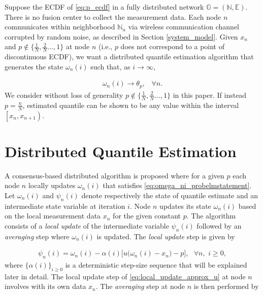 \documentclass[journal]{IEEEtran}
\begin{document}
Suppose the ECDF of \eqref{eq:p_ecdf} in a fully distributed network $\mathbb{G} = \left(\mathbb{N},\mathbb{E}\right)$. There is no fusion center to collect the measurement data. Each node $n$ communicates within neighborhood $\mathbb{N}_n$ via wireless communication channel corrupted by random noise, as described in Section \ref{system_model}. Given $x_n$ and $p \notin \{\frac{1}{N}, \frac{2}{N} \ldots, 1\}$ at node $n$ (i.e., $p$ does not correspond to a point of discontinuous ECDF), we want a distributed quantile estimation algorithm that generates the state $\omega_n(i)$ such that, as $i\to \infty$,

\vspace{-4mm}
\small 
\begin{align} 
\omega_n(i) \to \theta_p,\,\,\,\,\,\forall n. \label{eq:omega_ni_probelmstatement}
\end{align}
\normalsize 
We consider without loss of generality $p \notin \{\frac{1}{N}, \frac{2}{N} \ldots, 1\}$ in this paper. If instead $p=\frac{n}{N}$, estimated quantile can be shown to be any value within the interval $\left[x_n,x_{n+1}\right)$.




\vspace{-2mm}
\section{Distributed Quantile Estimation} \label{distributed_quantile_estimation}
A consensus-based distributed algorithm is proposed where for a given $p$ each node $n$ locally updates $\omega_n(i)$ that satisfies \eqref{eq:omega_ni_probelmstatement}{}{.} Let $\omega_n(i)$ and $\psi_n(i)$ denote respectively the state of quantile estimate and an intermediate state variable at iteration $i$. Node $n$ updates its state $\omega_n(i)$ based on the local measurement data $x_n$ for the given constant $p$. {}{The algorithm consists of a \emph{local update} of the intermediate variable $\psi_n(i)$ followed by an \emph{averaging} step where $\omega_n(i)$ is updated.} The \emph{local update} step is given by

\vspace{-4mm}
\small
\begin{align}
\psi_n(i) = \omega_n(i) - \alpha(i) \Big[u\big(\omega_n(i)-x_n\big) - p\Big],\,\,\,\,\forall n, \,\,i\ge0, \label{eq:local_update_approx_u}
\end{align}
\normalsize
where $\{\alpha(i)\}_{i \ge 0}$ is a deterministic step-size sequence that will be explained later in detail. The local update step of \eqref{eq:local_update_approx_u} at node $n$ {}{involves} with its own data $x_n$. The \emph{averaging} step at node $n$ is then performed by
\end{document}
